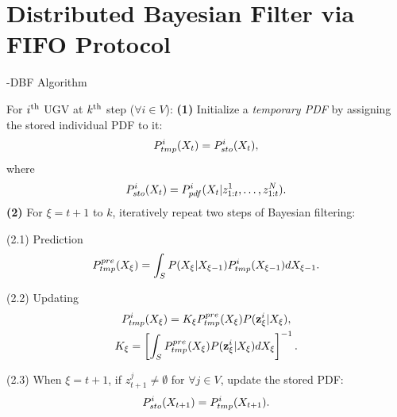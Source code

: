 \section{Distributed Bayesian Filter via FIFO Protocol}\label{sec:\proto-dbf}
	
		\begin{algorithm}
			\caption{\proto-DBF Algorithm}\label{alg:lifo-dbf}
			\begin{algorithmic}
				\State For $i^\text{th}$ UGV at $k^\text{th}$ step ($\forall i\in V$):
				\State\textbf{(1)} Initialize a \textit{temporary PDF} by assigning the stored individual PDF to it:
				\small\begin{equation*}
				P^i_{tmp}(X_{t})= P^i_{sto}(X_t),
				\end{equation*}\normalsize		
				where %
				\small\begin{equation*}
				P^i_{sto}(X_t) = P^i_{pdf}(X_{t}|z^1_{1:t},\dots,z^N_{1:t}).
				\end{equation*}\normalsize	
				\State\textbf{(2)} For $\xi=t+1$ to $k$, iteratively repeat two steps of Bayesian filtering:
				
				\State(2.1) Prediction 
				\small\begin{equation*}
				P_{tmp}^{pre}(X_{\xi})=\int_{S} P(X_{\xi}|X_{\xi-1})P^i_{tmp}(X_{\xi-1})dX_{\xi-1}.
				\end{equation*} \normalsize
				
				\State(2.2) Updating
				\small\begin{gather*}
				P^i_{tmp}(X_{\xi})=K_{\xi} P_{tmp}^{pre}(X_{\xi})P(\mathbf{z}^i_{\xi}|X_{\xi}),\\
				K_{\xi}=\left[\int_S P_{tmp}^{pre}(X_{\xi})P(\mathbf{z}^i_{\xi}|X_{\xi})dX_{\xi}\right]^{-1}.
				\end{gather*} \normalsize
				
				\State(2.3) When $\xi=t+1$, if $z^j_{t+1}\neq\emptyset$ for $\forall j\in V$, update the stored PDF:
				\small\begin{equation*}
				P^i_{sto}(X_{t+1})=P^i_{tmp}(X_{t+1}).
				\end{equation*}\normalsize
				

\end{algorithmic}
\end{algorithm}
